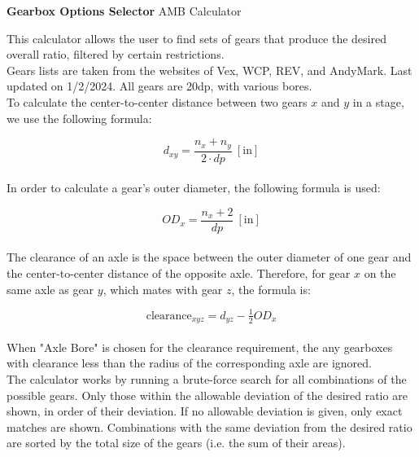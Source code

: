 \documentclass[a4paper]{article}
\begin{document}
	
	\Huge\textbf{Gearbox Options Selector}
	\newline
	\LARGE AMB Calculator
	
	\vspace{0.5cm}
	\normalsize
	
	This calculator allows the user to find sets of gears that produce the desired overall ratio, filtered by certain restrictions.\\
	
	Gears lists are taken from the websites of Vex, WCP, REV, and AndyMark. Last updated on 1/2/2024. All gears are 20dp, with various bores.\\
	
	To calculate the center-to-center distance between two gears $ x $ and $ y $ in a stage, we use the following formula:
	
	\begin{equation}
		d_{xy} = \frac{n_x + n_y}{2 \cdot dp}\ \left[ \text{in} \right]
	\end{equation}
	\\
	In order to calculate a gear's outer diameter, the following formula is used:
	
	\begin{equation}
		OD_x = \frac{n_x + 2}{dp}\ \left[ \text{in} \right]
	\end{equation}
	\\
	The clearance of an axle is the space between the outer diameter of one gear and the center-to-center distance of the opposite axle. Therefore, for gear $ x $ on the same axle as gear $ y $, which mates with gear $ z $, the formula is:
	
	\begin{equation}
		\text{clearance}_{xyz} = d_{yz} - \tfrac{1}{2} OD_x
	\end{equation}
	\\
	When "Axle Bore" is chosen for the clearance requirement, the any gearboxes with clearance less than the radius of the corresponding axle are ignored.\\
	
	The calculator works by running a brute-force search for all combinations of the possible gears. Only those within the allowable deviation of the desired ratio are shown, in order of their deviation. If no allowable deviation is given, only exact matches are shown. Combinations with the same deviation from the desired ratio are sorted by the total size of the gears (i.e. the sum of their areas).
	
	
	\newpage
\end{document}
